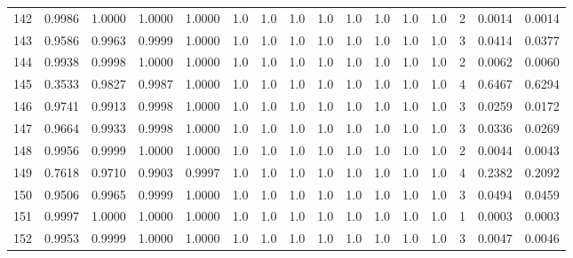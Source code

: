 \begin{tabular}{lrrrrrrrrrrrrrrr}
142 &      0.9986 &  1.0000 &  1.0000 &  1.0000 &     1.0 &     1.0 &     1.0 &     1.0 &     1.0 &     1.0 &      1.0 &        1.0 &      2 &                    0.0014 &                     0.0014 \\
143 &      0.9586 &  0.9963 &  0.9999 &  1.0000 &     1.0 &     1.0 &     1.0 &     1.0 &     1.0 &     1.0 &      1.0 &        1.0 &      3 &                    0.0414 &                     0.0377 \\
144 &      0.9938 &  0.9998 &  1.0000 &  1.0000 &     1.0 &     1.0 &     1.0 &     1.0 &     1.0 &     1.0 &      1.0 &        1.0 &      2 &                    0.0062 &                     0.0060 \\
145 &      0.3533 &  0.9827 &  0.9987 &  1.0000 &     1.0 &     1.0 &     1.0 &     1.0 &     1.0 &     1.0 &      1.0 &        1.0 &      4 &                    0.6467 &                     0.6294 \\
146 &      0.9741 &  0.9913 &  0.9998 &  1.0000 &     1.0 &     1.0 &     1.0 &     1.0 &     1.0 &     1.0 &      1.0 &        1.0 &      3 &                    0.0259 &                     0.0172 \\
147 &      0.9664 &  0.9933 &  0.9998 &  1.0000 &     1.0 &     1.0 &     1.0 &     1.0 &     1.0 &     1.0 &      1.0 &        1.0 &      3 &                    0.0336 &                     0.0269 \\
148 &      0.9956 &  0.9999 &  1.0000 &  1.0000 &     1.0 &     1.0 &     1.0 &     1.0 &     1.0 &     1.0 &      1.0 &        1.0 &      2 &                    0.0044 &                     0.0043 \\
149 &      0.7618 &  0.9710 &  0.9903 &  0.9997 &     1.0 &     1.0 &     1.0 &     1.0 &     1.0 &     1.0 &      1.0 &        1.0 &      4 &                    0.2382 &                     0.2092 \\
150 &      0.9506 &  0.9965 &  0.9999 &  1.0000 &     1.0 &     1.0 &     1.0 &     1.0 &     1.0 &     1.0 &      1.0 &        1.0 &      3 &                    0.0494 &                     0.0459 \\
151 &      0.9997 &  1.0000 &  1.0000 &  1.0000 &     1.0 &     1.0 &     1.0 &     1.0 &     1.0 &     1.0 &      1.0 &        1.0 &      1 &                    0.0003 &                     0.0003 \\
152 &      0.9953 &  0.9999 &  1.0000 &  1.0000 &     1.0 &     1.0 &     1.0 &     1.0 &     1.0 &     1.0 &      1.0 &        1.0 &      3 &                    0.0047 &                     0.0046 \\

\end{tabular}
